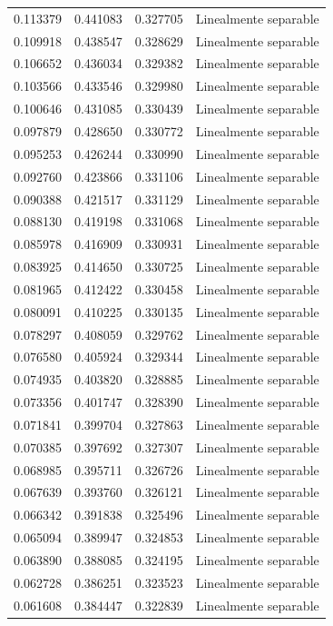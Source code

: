 \begin{tabular}{llll}
0.113379 & 0.441083 & 0.327705 & Linealmente separable \\
0.109918 & 0.438547 & 0.328629 & Linealmente separable \\
0.106652 & 0.436034 & 0.329382 & Linealmente separable \\
0.103566 & 0.433546 & 0.329980 & Linealmente separable \\
0.100646 & 0.431085 & 0.330439 & Linealmente separable \\
0.097879 & 0.428650 & 0.330772 & Linealmente separable \\
0.095253 & 0.426244 & 0.330990 & Linealmente separable \\
0.092760 & 0.423866 & 0.331106 & Linealmente separable \\
0.090388 & 0.421517 & 0.331129 & Linealmente separable \\
0.088130 & 0.419198 & 0.331068 & Linealmente separable \\
0.085978 & 0.416909 & 0.330931 & Linealmente separable \\
0.083925 & 0.414650 & 0.330725 & Linealmente separable \\
0.081965 & 0.412422 & 0.330458 & Linealmente separable \\
0.080091 & 0.410225 & 0.330135 & Linealmente separable \\
0.078297 & 0.408059 & 0.329762 & Linealmente separable \\
0.076580 & 0.405924 & 0.329344 & Linealmente separable \\
0.074935 & 0.403820 & 0.328885 & Linealmente separable \\
0.073356 & 0.401747 & 0.328390 & Linealmente separable \\
0.071841 & 0.399704 & 0.327863 & Linealmente separable \\
0.070385 & 0.397692 & 0.327307 & Linealmente separable \\
0.068985 & 0.395711 & 0.326726 & Linealmente separable \\
0.067639 & 0.393760 & 0.326121 & Linealmente separable \\
0.066342 & 0.391838 & 0.325496 & Linealmente separable \\
0.065094 & 0.389947 & 0.324853 & Linealmente separable \\
0.063890 & 0.388085 & 0.324195 & Linealmente separable \\
0.062728 & 0.386251 & 0.323523 & Linealmente separable \\
0.061608 & 0.384447 & 0.322839 & Linealmente separable \\

\end{tabular}
